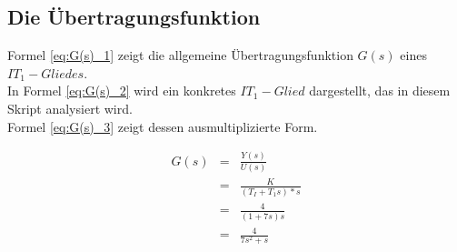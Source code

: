 \subsection{Die Übertragungsfunktion}

Formel \ref{eq:G(s)_1} zeigt die allgemeine Übertragungsfunktion $G(s)$ eines $IT_1-Gliedes$.\\ In Formel \ref{eq:G(s)_2} wird ein konkretes $IT_1-Glied$ dargestellt, das in diesem Skript analysiert wird. \\ Formel \ref{eq:G(s)_3} zeigt dessen ausmultiplizierte Form.

\begin{eqnarray}
G(s) &=& \frac{Y(s)}{U(s)} \\
\label{eq:G(s)_1}
&=& \frac{K}{(T_I+T_1s)*s} \\
\label{eq:G(s)_2}
&=& \frac{4}{(1+7s)s} \\
\label{eq:G(s)_3}
&=& \frac{4}{7s^2+s}
\end{eqnarray}